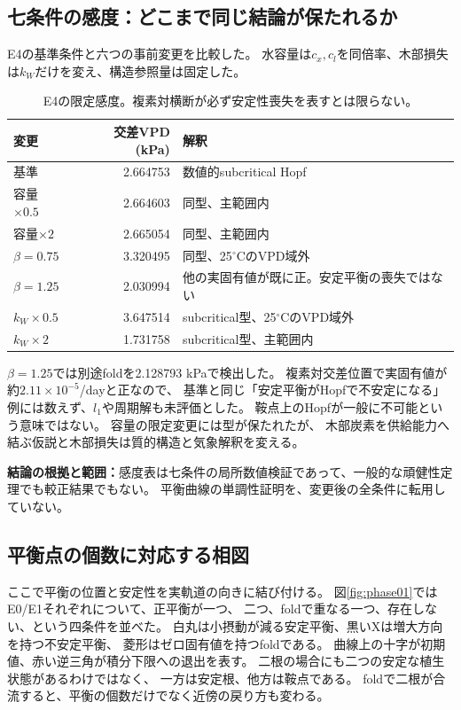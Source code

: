 \documentclass[a4paper,11pt]{ltjsarticle}
\newcommand{\evidence}[1]{\par\smallskip\noindent\textbf{結論の根拠と範囲：}#1\par\smallskip}
\begin{document}
\subsection{七条件の感度：どこまで同じ結論が保たれるか}
E4の基準条件と六つの事前変更を比較した。
水容量は$c_x,c_l$を同倍率、木部損失は$k_W$だけを変え、構造参照量は固定した。
\begin{table}[tb]
\centering
\caption{E4の限定感度。複素対横断が必ず安定性喪失を表すとは限らない。}
\begin{tabular}{lrp{.46\linewidth}}
\toprule
変更&交差VPD (kPa)&解釈\\\midrule
基準&2.664753&数値的subcritical Hopf\\
容量$\times0.5$&2.664603&同型、主範囲内\\
容量$\times2$&2.665054&同型、主範囲内\\
$\beta=0.75$&3.320495&同型、25$^\circ$CのVPD域外\\
$\beta=1.25$&2.030994&他の実固有値が既に正。安定平衡の喪失ではない\\
$k_W\times0.5$&3.647514&subcritical型、25$^\circ$CのVPD域外\\
$k_W\times2$&1.731758&subcritical型、主範囲内\\
\bottomrule
\end{tabular}
\end{table}
$\beta=1.25$では別途foldを2.128793 kPaで検出した。
複素対交差位置で実固有値が約$2.11\times10^{-5}$/dayと正なので、
基準と同じ「安定平衡がHopfで不安定になる」例には数えず、$l_1$や周期解も未評価とした。
鞍点上のHopfが一般に不可能という意味ではない。
容量の限定変更には型が保たれたが、
木部炭素を供給能力へ結ぶ仮説と木部損失は質的構造と気象解釈を変える。
\evidence{感度表は七条件の局所数値検証であって、一般的な頑健性定理でも較正結果でもない。
平衡曲線の単調性証明を、変更後の全条件に転用していない。}

\subsection{平衡点の個数に対応する相図}\label{sec:phaseportraits}
ここで平衡の位置と安定性を実軌道の向きに結び付ける。
図\ref{fig:phase01}ではE0/E1それぞれについて、正平衡が一つ、
二つ、foldで重なる一つ、存在しない、という四条件を並べた。
白丸は小摂動が減る安定平衡、黒いXは増大方向を持つ不安定平衡、
菱形はゼロ固有値を持つfoldである。
曲線上の十字が初期値、赤い逆三角が積分下限への退出を表す。
二根の場合にも二つの安定な植生状態があるわけではなく、
一方は安定根、他方は鞍点である。
foldで二根が合流すると、平衡の個数だけでなく近傍の戻り方も変わる。
\end{document}
